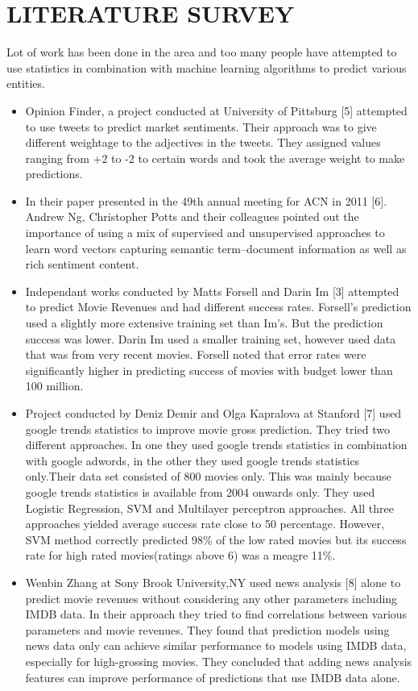 \chapter{LITERATURE SURVEY}
Lot of work has been done in the area and too many people have attempted to use statistics in combination with machine learning algorithms to predict various entities.\\
\begin{itemize}
\item Opinion Finder, a project conducted at University of Pittsburg [5] attempted to  use tweets to predict market sentiments. Their approach was to give different weightage to the adjectives in the tweets. They assigned values ranging from +2 to -2 to certain words and took the average weight to make predictions.
\item In their paper presented in the 49th annual meeting for ACN in 2011 [6]. Andrew Ng, Christopher Potts and their colleagues pointed out the importance of using a mix of supervised and unsupervised  approaches to learn word vectors capturing semantic term–document information as well as rich sentiment content.
\item Independant works conducted by Matts Forsell and Darin Im [3] attempted to predict Movie Revenues and had different success rates. Forsell’s prediction used a slightly more extensive training set than Im’s. But the prediction success was lower. Darin Im used a smaller training set, however used data that was from very recent movies. Forsell noted that error rates were significantly higher in predicting success of movies with budget lower than 100 million. 
\item Project conducted by Deniz Demir and Olga Kapralova at Stanford [7] used google trends statistics to improve movie gross prediction. They tried two different approaches. In one they used google trends statistics in combination with google adwords, in the other they used google trends statistics only.Their data set consisted of 800 movies only. This was mainly because google trends statistics  is available from 2004 onwards only. They used Logistic Regression, SVM and Multilayer perceptron approaches. All three approaches yielded average success rate close to 50 percentage. However, SVM method correctly predicted 98\% of the low rated movies but its success rate for high rated movies(ratings above 6) was a meagre 11\%.

\item Wenbin Zhang at Sony Brook University,NY used news analysis [8] alone to predict movie revenues without considering any other parameters including IMDB data. In their approach they tried to find correlations between various parameters and movie revenues. They found that prediction models using news data only can achieve similar performance to models using IMDB data, especially for high-grossing movies. They concluded that adding news analysis features can improve performance of predictions that use IMDB data alone.
\end{itemize}
\clearpage

